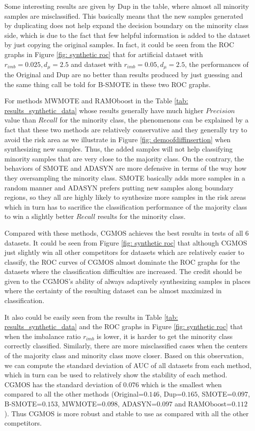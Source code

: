 \documentclass{iitthesis}
\begin{document}
Some interesting results are given by Dup in the table, where almost all minority samples are misclassified. This basically means that the new samples generated by duplicating does not help expand the decision boundary on the minority class side, which is due to the fact that few helpful information is added to the dataset by just copying the original samples. In fact, it could be seen from the ROC graphs in Figure \ref{fig: synthetic roc} that for artificial dataset with $r_{imb}= 0.025, d_{\mu}=2.5$ and dataset with $r_{imb}=0.05, d_{\mu}=2.5$, the performances of the Original and Dup are no better than results produced by just guessing and the same thing call be told for B-SMOTE in these two ROC graphs.

For methods MWMOTE and RAMOboost in the Table \ref{tab: results_synthetic_data} whose results generally have much higher $Precision$ value than $Recall$ for the minority class, the phenomenons can be explained by a fact that these two methods are relatively conservative and they generally try to avoid the risk area as we illustrate in Figure \ref{fig: demoofdiffinsertion} when synthesizing new samples. Thus, the added samples will not help classifying minority samples that are very close to the majority class. On the contrary, the behaviors of SMOTE and ADASYN are more defensive in terms of the way how they oversampling the minority class. SMOTE basically adds more samples in a random manner and ADASYN prefers putting new samples along boundary regions, so they all are highly likely to synthesize more samples in the risk areas which in turn has to sacrifice the classification performance of the majority class to win a slightly better $Recall$ results for the minority class.

Compared with these methods, CGMOS achieves the best results in tests of all 6 datasets. It could be seen from Figure \ref{fig: synthetic roc} that although CGMOS just slightly win all other competitors for datasets which are relatively easier to classify, the ROC curves of CGMOS almost dominate the ROC graphs for the datasets where the classification difficulties are increased. The credit should be given to the CGMOS's ability of always adaptively synthesizing samples in places where the certainty of the resulting dataset can be almost maximized in classification.

It also could be easily seen from the results in Table \ref{tab: results_synthetic_data} and the ROC graphs in Figure \ref{fig: synthetic roc} that when the imbalance ratio $r_{imb}$ is lower, it is harder to get the minority class correctly classified. Similarly, there are more misclassified cases when the centers of the majority class and minority class move closer. Based on this observation, we can compute the standard deviation of AUC of all datasets from each method, which in turn can be used to relatively show the stability of each method. CGMOS has the standard deviation of $0.076$ which is the smallest when compared to all the other methods (Original=$0.146$, Dup=$0.165$, SMOTE=$0.097$, B-SMOTE=$0.153$, MWMOTE=$0.098$, ADASYN=$0.097$ and RAMOboost=$0.112$). Thus CGMOS is more robust and stable to use as compared with all the other competitors.
\end{document}
